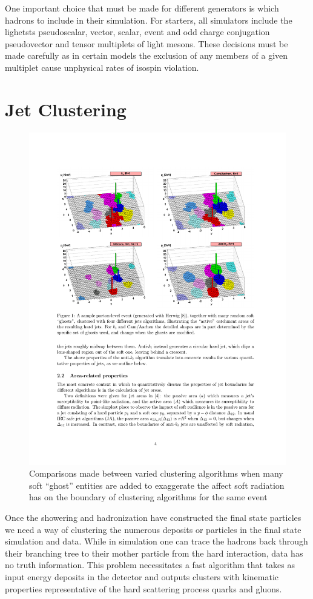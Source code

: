 One important choice that must be made for different generators is which hadrons to include in their simulation. For starters,
all simulators include the lighetsts pseudoscalar, vector, scalar, event and odd charge conjugation pseudovector and tensor multiplets of light mesons. These decisions 
must be made carefully as in certain models the exclusion of any members of a given multiplet cause unphysical rates of isospin violation. 

\section{Jet Clustering}

\begin{figure}
\begin{center}
\includegraphics[width=.75\textwidth]{pics/antikt}
\end{center}
\caption{Comparisons made between varied clustering algorithms when many soft ``ghost'' entities are added
to exaggerate the affect soft radiation has on the boundary of clustering algorithms for the same event}
\label{fig:antikt}
\end{figure}

Once the showering and hadronization have constructed the final state particles we need a way of clustering the numerous deposits or
particles in the final state simulation and data. While in simulation one can trace the
 hadrons back through their branching tree to their mother particle from the hard interaction,
data has no truth information. This problem necessitates a fast algorithm that takes as input energy deposits in the 
detector and outputs clusters with kinematic properties representative of the hard scattering process quarks and gluons. 

